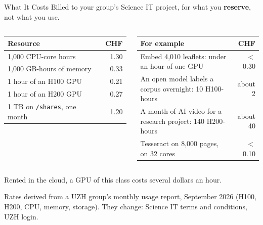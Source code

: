 \documentclass[svgnames,x11names,dvipsnames]{beamer}
\newcommand{\new}[1]{#1}
\begin{document}
\begin{frame}{\new{What It Costs}}
\footnotesize
Billed to your group's Science IT project, for what you \textbf{reserve}, not what you use.

\vspace{0.2cm}
\renewcommand{\arraystretch}{1.3}
\begin{columns}[T]
\begin{tabular}{@{}lr@{}}
\toprule
\textbf{Resource} & \textbf{CHF} \\
\midrule
1,000 CPU-core hours & 1.30 \\
1,000 GB-hours of memory & 0.33 \\
1 hour of an H100 GPU & 0.21 \\
1 hour of an H200 GPU & 0.27 \\
1 TB on \texttt{/shares}, one month & 1.20 \\
\bottomrule
\end{tabular}
\begin{tabular}{@{}>{\raggedright\arraybackslash}p{4.4cm}r@{}}
\toprule
\textbf{For example} & \textbf{CHF} \\
\midrule
Embed 4,010 leaflets: under an hour of one GPU & $<$ 0.30 \\
An open model labels a corpus overnight: 10 H100-hours & about 2 \\
A month of AI video for a research project: 140 H200-hours & about 40 \\
Tesseract on 8,000 pages, on 32 cores & $<$ 0.10 \\
\bottomrule
\end{tabular}
\end{columns}

\vspace{0.3cm}
Rented in the cloud, a GPU of this class costs several dollars an hour.

\vspace{0.1cm}
{\scriptsize Rates derived from a UZH group's monthly usage report, September 2026 (H100, H200, CPU, memory, storage). They change: Science IT terms and conditions, UZH login.}
\end{frame}
\end{document}
